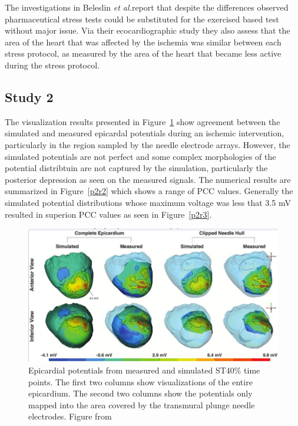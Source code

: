 \documentclass[12pt]{article}
\newcommand{\etal}{{\em et al.}}
\begin{document}
The investigations in Beleslin \etal report that despite the differences observed pharmaceutical stress tests could be substituted for the exercised based test without major issue. Via their ecocardiographic study they also assess that the area of the heart that was affected by the ischemia was similar between each stress protocol, as measured by the area of the heart that became less active during the stress protocol.

\subsection{Study 2}
The visualization results presented in Figure~\ref{p2r1} show agreement between the simulated and measured epicardal potentials during an ischemic intervention, particularly in the region sampled by the needle electrode arrays. However,  the simulated potentials are not perfect and some complex morphologies of the potential distribtuin are not captured by the simulation, particularly the posterior depression as seen on the measured signals. The numerical results are summarized in Figure~\ref{p2r2} which shows a range of PCC values. Generally the simulated potential distributions whose maximum voltage was less that 3.5 mV resulted in superion PCC values as seen in Figure~\ref{p2r3}.

\begin{figure}[H]
	\centering
	\includegraphics[width=(\textwidth)]{Figures/Paper2Result1.png}
	\caption{Epicardial potentials from measured and simulated ST40\% time points. The first two columns show visualizations of the entire epicardium. The second two columns show the potentials only mapped into the area covered by the transmural plunge needle electrodes. Figure from \cite{RSM:Bur2018b}}
	\label{p2r1}
\end{figure}
\end{document}
